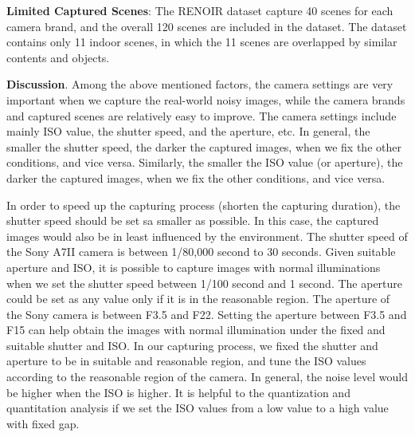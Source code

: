 \textbf{Limited Captured Scenes}: The RENOIR dataset \cite{RENOIR2014} capture 40 scenes for each camera brand, and the overall 120 scenes are included in the dataset.  The dataset \cite{crosschannel2016} contains only 11 indoor scenes, in which the 11 scenes are overlapped by similar contents and objects. 



\textbf{Discussion}. Among the above mentioned factors, the camera settings are very important when we capture the real-world noisy images, while the camera brands and captured scenes are relatively easy to improve. The camera settings include mainly ISO value, the shutter speed, and the aperture, etc. In general, the smaller the shutter speed, the darker the captured images, when we fix the other conditions, and vice versa. Similarly, the smaller the ISO value (or aperture), the darker the captured images, when we fix the other conditions, and vice versa. 

In order to speed up the capturing process (shorten the capturing duration), the shutter speed should be set sa smaller as possible. In this case, the captured images would also be in least influenced by the environment. The shutter speed of the Sony A7II camera is between 1/80,000 second to 30 seconds. Given suitable aperture and ISO, it is possible to capture images with normal illuminations when we set the shutter speed between 1/100 second and 1 second. The aperture could be set as any value only if it is in the reasonable region. The aperture of the Sony camera is between F3.5 and F22. Setting the aperture between F3.5 and F15 can help obtain the images with normal illumination under the fixed and suitable shutter and ISO. In our capturing process, we fixed the shutter and aperture to be in suitable and reasonable region, and tune the ISO values according to the reasonable region of the camera. In general, the noise level would be higher when the ISO is higher. It is helpful to the quantization and quantitation analysis if we set the ISO values from a low value to a high value with fixed gap.

